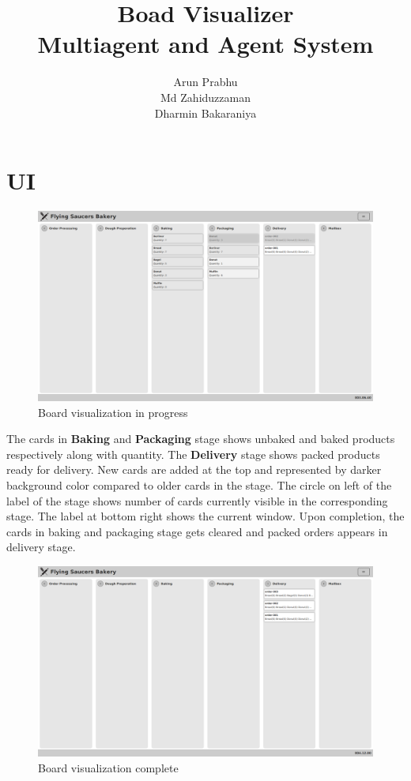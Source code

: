 \documentclass[12pt]{article}
\title{Boad Visualizer\\Multiagent and Agent System}
\author{Arun Prabhu\\Md Zahiduzzaman\\Dharmin Bakaraniya}
\begin{document}
\maketitle{}
\pagebreak

\section{UI}
\begin{figure}[htpb]
	\centering
	\includegraphics[width=1.0\linewidth]{visualizer-ui.png}
	\caption{Board visualization in progress}
\end{figure}

The cards in \textbf{Baking} and \textbf{Packaging} stage shows unbaked and baked products respectively along with quantity. The \textbf{Delivery} stage shows packed products ready for delivery. New cards are added at the top and represented by darker background color compared to older cards in the stage. The circle on left of the label of the stage shows number of cards currently visible in the corresponding stage. The label at bottom right shows the current window. Upon completion, the cards in baking and packaging stage gets cleared and packed orders appears in delivery stage.

\newpage
\begin{figure}[htpb]
	\centering
	\includegraphics[width=1.0\linewidth]{visualizer-complete.png}
	\caption{Board visualization complete}
\end{figure}
\end{document}
